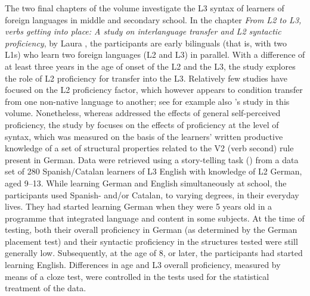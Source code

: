 \documentclass[output=paper,colorlinks,citecolor=brown,nonflat]{langsci/langscibook}
\begin{document}
The two final chapters of the volume investigate the L3 syntax of learners of foreign languages in middle and secondary school. In the chapter \textit{From L2 to L3, verbs getting into place: A study on interlanguage transfer and L2 syntactic proficiency}, by Laura \citeauthor{chapters/sanchez7}, the participants are early bilinguals (that is, with two L1s) who learn two foreign languages (L2 and L3) in parallel. With a difference of at least three years in the age of onset of the L2 and the L3, the study explores the role of L2 proficiency for transfer into the L3. Relatively few studies have focused on the L2 proficiency factor, which however appears to condition transfer from one non-native language to another; see for example also \citeauthor{chapters/sciutti}’s study in this volume. Nonetheless, whereas \citeauthor{chapters/sciutti} addressed the effects of general self-perceived proficiency, the study by \citeauthor{chapters/sanchez7} focuses on the effects of proficiency at the level of syntax, which was measured on the basis of the learners’ written productive knowledge of a set of structural properties related to the V2 (verb second) rule present in German. Data were retrieved using a story-telling task (\citealt{SánchezJarvis2008}) from a data set of 280 Spanish/Catalan learners of L3 English with knowledge of L2 German, aged 9--13. While learning German and English simultaneously at school, the participants used Spanish- and/or Catalan, to varying degrees, in their everyday lives. They had started learning German when they were 5 years old in a programme that integrated language and content in some subjects. At the time of testing, both their overall proficiency in German (as determined by the German placement test) and their syntactic proficiency in the structures tested were still generally low. Subsequently, at the age of 8, or later, the participants had started learning English. Differences in age and L3 overall proficiency, measured by means of a cloze test, were controlled in the tests used for the statistical treatment of the data.
\end{document}
